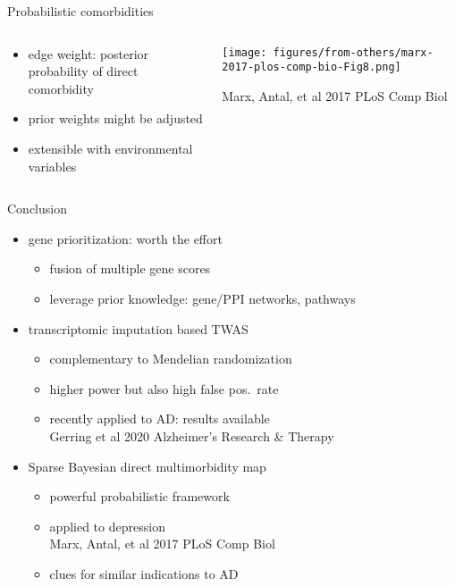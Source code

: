 \documentclass{beamer}
\begin{document}
\begin{frame}{Probabilistic comorbidities}
\begin{columns}[t]
\begin{column}{0.3\textwidth}
\begin{itemize}
\item edge weight: posterior probability of direct comorbidity
\item prior weights might be adjusted
\item extensible with environmental variables
\end{itemize}
\end{column}

\begin{column}{0.7\textwidth}

\texttt{[image: figures/from-others/marx-2017-plos-comp-bio-Fig8.png]}

\tiny{Marx, Antal, et al 2017 PLoS Comp Biol}
\end{column}
\end{columns}
\end{frame}

\begin{frame}{Conclusion}
\begin{itemize}
\item gene prioritization: worth the effort
\begin{itemize}
\item fusion of multiple gene scores
\item leverage prior knowledge: gene/PPI networks, pathways
\end{itemize}
\item transcriptomic imputation based TWAS
\begin{itemize}
\item complementary to Mendelian randomization
\item higher power but also high false pos.~rate
\item recently applied to AD: results available\\\tiny{Gerring et al 2020 Alzheimer's Research \& Therapy}
\end{itemize}
\item Sparse Bayesian direct multimorbidity map
\begin{itemize}
\item powerful probabilistic framework
\item applied to depression\\
\tiny{Marx, Antal, et al 2017 PLoS Comp Biol}
\normalsize
\item clues for similar indications to AD
\end{itemize}
\end{itemize}
\end{frame}
\end{document}
